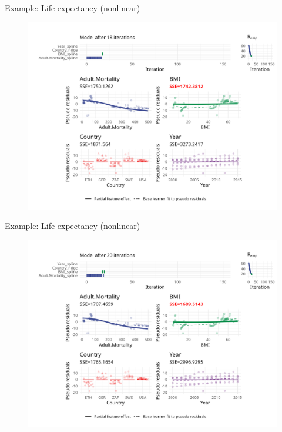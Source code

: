 \begin{frame}{Example: Life expectancy (nonlinear)}
	\begin{figure}
		\centering
		\includegraphics[width=\textwidth]{figure/cwb-anim-nl/fig-iter-0018.png}
	\end{figure}
	\addtocounter{framenumber}{-1}
\end{frame}


\begin{frame}{Example: Life expectancy (nonlinear)}
	\begin{figure}
		\centering
		\includegraphics[width=\textwidth]{figure/cwb-anim-nl/fig-iter-0020.png}
	\end{figure}
	\addtocounter{framenumber}{-1}
\end{frame}


